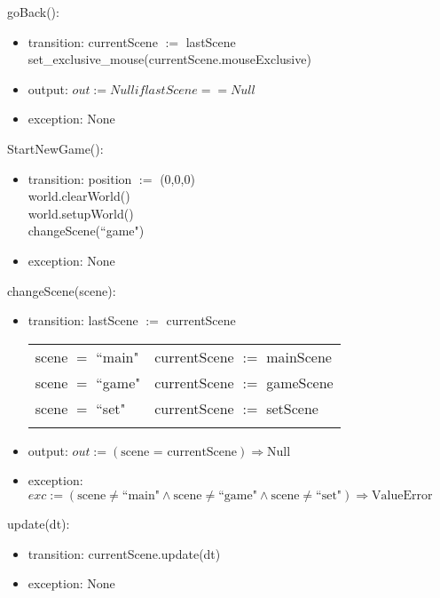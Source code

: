 \documentclass{article}
\begin{document}
\noindent goBack():
\begin{itemize}
\item transition: currentScene $:=$ lastScene\\
    set\_exclusive\_mouse(currentScene.mouseExclusive)
\item output: $out:= Null if lastScene == Null$
\item exception: None
\end{itemize}\vspace{6mm}

\noindent StartNewGame():
\begin{itemize}
\item transition: position $:=$ (0,0,0)\\
    world.clearWorld()\\
    world.setupWorld()\\
    changeScene(``game")
\item exception: None
\end{itemize}\vspace{6mm}

\noindent changeScene(scene):
\begin{itemize}
\item transition: lastScene $:=$ currentScene

\begin{tabular}{|l|l|}
\hhline{|-|-|}
scene $=$ ``main" & currentScene $:=$ mainScene \\
\hhline{|-|-|}
scene $=$ ``game" & currentScene $:=$ gameScene \\
\hhline{|-|-|}
scene $=$ ``set" & currentScene $:=$ setScene \\
\hhline{|-|-|}
\end{tabular}

\item output: $out := (\text{scene = currentScene}) \Rightarrow \text{Null}$
\item exception: $exc := (\text{scene} \neq \text{``main"} \land \text{scene} \neq \text{``game"} \land \text{scene} \neq \text{``set"}) \Rightarrow \text{ValueError}$
\end{itemize}\vspace{6mm}

\noindent update(dt):
\begin{itemize}
\item transition: currentScene.update(dt)
\item exception: None
\end{itemize}\vspace{6mm}
\end{document}
